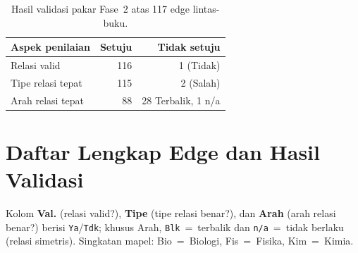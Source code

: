 \documentclass[main]{subfiles}
\begin{document}
\begin{table}[h]
  \centering
  \caption{Hasil validasi pakar Fase~2 atas 117 edge lintas-buku.}
  \label{tab:lb-validasi}
  \footnotesize
  \begin{tabularx}{\linewidth}{@{}X r r@{}}
    \toprule
    \textbf{Aspek penilaian} & \textbf{Setuju} & \textbf{Tidak setuju} \\
    \midrule
    Relasi valid & 116 & 1 (Tidak) \\
    Tipe relasi tepat & 115 & 2 (Salah) \\
    Arah relasi tepat & 88 & 28 Terbalik, 1 n/a \\
    \bottomrule
  \end{tabularx}
\end{table}

\section{Daftar Lengkap Edge dan Hasil Validasi}
\label{lamp:lintas-buku-daftar}

Kolom \textbf{Val.} (relasi valid?), \textbf{Tipe} (tipe relasi benar?), dan
\textbf{Arah} (arah relasi benar?) berisi \texttt{Ya}/\texttt{Tdk}; khusus Arah,
\texttt{Blk}~=~terbalik dan \texttt{n/a}~=~tidak berlaku (relasi simetris).
Singkatan mapel: Bio~=~Biologi, Fis~=~Fisika, Kim~=~Kimia.
\end{document}
